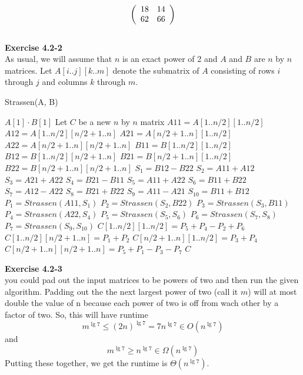 \documentclass{article}
\begin{document}
\[
\left(\begin{array}{c c}18&14\\62&66\end{array}\right)
\]\\

\noindent\textbf{Exercise 4.2-2}\\

As usual, we will assume that $n$ is an exact power of 2 and $A$ and $B$ are $n$ by $n$ matrices.  Let $A[i..j][k..m]$ denote the submatrix of $A$ consisting of rows $i$ through $j$ and columns $k$ through $m$. \\
\begin{algorithm}
\caption{Strassen(A, B)}
\begin{algorithmic}
	\State \Return $A[1]\cdot B[1]$
\EndIf
\State Let $C$ be a new $n$ by $n$ matrix
\State $A11 = A[1..n/2][1..n/2]$
\State $A12 = A[1..n/2][n/2+1..n]$
\State $A21 = A[n/2+1..n][1..n/2]$
\State $A22 = A[n/2+1..n][n/2+1..n]$
\State $B11 = B[1..n/2][1..n/2]$
\State $B12 = B[1..n/2][n/2+1..n]$
\State $B21 = B[n/2+1..n][1..n/2]$
\State $B22 = B[n/2+1..n][n/2+1..n]$
\State $S_1 = B12-B22$
\State $S_2 = A11+A12$
\State $S_3 = A21 + A22$
\State $S_4 = B21-B11$
\State $S_5 = A11 + A22$
\State $S_6 = B11 + B22$
\State $S_7 = A12 - A22$
\State $S_8 = B21 + B22$
\State $S_9 = A11 - A21$
\State $S_{10} = B11 + B12$
\State $P_1 = Strassen(A11, S_1)$
\State $P_2 = Strassen(S_2, B22)$
\State $P_3 = Strassen(S_3, B11)$
\State $P_4 = Strassen(A22, S_4)$
\State $P_5 = Strassen(S_5, S_6)$
\State $P_6 = Strassen(S_7, S_8)$
\State $P_7 = Strassen(S_9, S_{10})$
\State $C[1..n/2][1..n/2] = P_5 + P_4 - P_2 + P_6$
\State $C[1..n/2][n/2+1..n] = P_1 + P_2$
\State $C[n/2+1..n][1..n/2] = P_3 + P_4$
\State $C[n/2+1..n][n/2+1..n] = P_5 + P_1 - P_3 - P_7$ 
\State \Return $C$
\end{algorithmic}
\end{algorithm}


\noindent\textbf{Exercise 4.2-3}\\

you could pad out the input matrices to be powers of two and then run the given algorithm. Padding out the the next largest power of two (call it $m$) will at most double the value of n because each power of two is off from wach other by a factor of two. So, this will have runtime
\[
m^{\lg 7} \le (2n)^{\lg 7} = 7 n^{\lg 7} \in O(n^{\lg 7})
\]
and
\[
m^{\lg 7} \ge n^{\lg 7} \in \Omega(n^{\lg 7})
\]
Putting these together, we get the runtime is $\Theta(n^{\lg 7})$.\\
\end{document}
